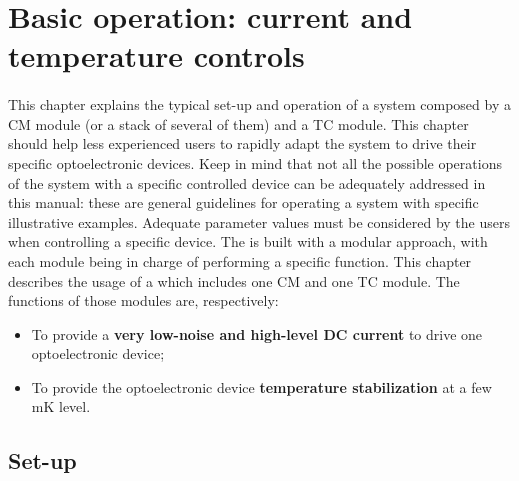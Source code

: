 \section{Basic operation: current and temperature controls} \label{cpt:basic_operation_main}

\paragraph{} This chapter explains the typical set-up and operation of a \QubeModel  system composed by a CM module (or a stack of several of them) and a TC module. This chapter should help less experienced users to rapidly adapt the \QubeModel  system to drive their specific optoelectronic devices. Keep in mind that not all the possible operations of the \QubeModel  system with a specific controlled device can be adequately addressed in this manual: these are general guidelines for operating a \QubeModel  system with specific illustrative examples. Adequate parameter values must be considered by the users when controlling a specific device.
\newline
The \QubeModel  is built with a modular approach, with each module being in charge of performing a specific function. This chapter describes the usage of a \QubeModel  which includes one CM and one TC module. The functions of those modules are, respectively:
\begin{itemize}
    \item To provide a \textbf{very low-noise and high-level DC current} to drive one optoelectronic device;
    \item To provide the optoelectronic device \textbf{temperature stabilization} at a few mK level.
\end{itemize}





\subsection{Set-up} \label{cpt:setup}
